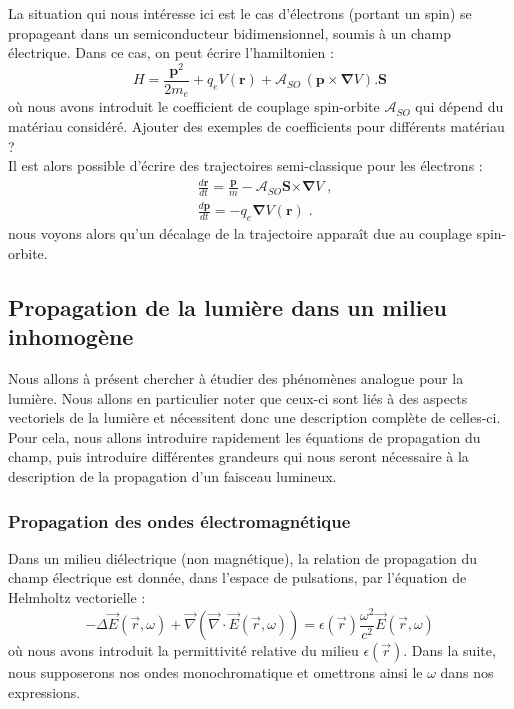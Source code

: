 \documentclass[a4paper,11pt]{article} %
\begin{document}
	La situation qui nous intéresse ici est le cas d'électrons (portant un spin) se propageant dans un semiconducteur bidimensionnel, soumis à un champ électrique. Dans ce cas, on peut écrire l'hamiltonien :
	\begin{equation*}
		\label{exp_hamiltonien_SHE}
		H = \frac{\bm{p}^2}{2m_e} + q_e V(\bm{r}) + \mathcal{A}_{SO} \, (\bm{p \times \! \nabla} V) \bm{. S}
	\end{equation*}
	où nous avons introduit le coefficient de couplage spin-orbite $ \mathcal{A}_{SO} $ qui dépend du matériau considéré. {\color{gray} Ajouter des exemples de coefficients pour différents matériau ?}\\ %
	
	Il est alors possible d'écrire des trajectoires semi-classique pour les électrons :
	\begin{align}
		& \frac{d\bm{r}}{dt} = \frac{\bm{p}}{m} - \mathcal{A}_{SO} \bm{S} \bm{\times \nabla} V \; , \label{eq_mvt_SHE_r} \\
		& \frac{d \bm{p}}{dt} = - q_e \bm{\nabla} V(\bm{r}) \; . \label{eq_mvt_SHE_p}
	\end{align}
	nous voyons alors qu'un décalage de la trajectoire apparaît due au couplage spin-orbite.
	
	
	\subsection{Propagation de la lumière dans un milieu inhomogène}
	Nous allons à présent chercher à étudier des phénomènes analogue pour la lumière. Nous allons en particulier noter que ceux-ci sont liés à des aspects vectoriels de la lumière et nécessitent donc une description complète de celles-ci. Pour cela, nous allons introduire rapidement les équations de propagation du champ, puis introduire différentes grandeurs qui nous seront nécessaire à la description de la propagation d'un faisceau lumineux.
	
	\subsubsection{Propagation des ondes électromagnétique}
	Dans un milieu diélectrique (non magnétique), la relation de propagation du champ électrique est donnée, dans l'espace de pulsations, par l'équation de Helmholtz vectorielle :
	\begin{equation*}
		\label{eq_Helmholtz_vect}
		- \varDelta \vec{E}(\vec{r}, \omega) + \vec{\nabla}(\vec{\nabla}\cdot \vec{E}(\vec{r}, \omega)) = \epsilon(\vec{r}) \frac{\omega^2}{c^2} \vec{E}(\vec{r}, \omega)
	\end{equation*}
	où nous avons introduit la permittivité relative du milieu $ \epsilon(\vec{r}) $. Dans la suite, nous supposerons nos ondes monochromatique et omettrons ainsi le $\omega$ dans nos expressions.\\
	
\end{document}
